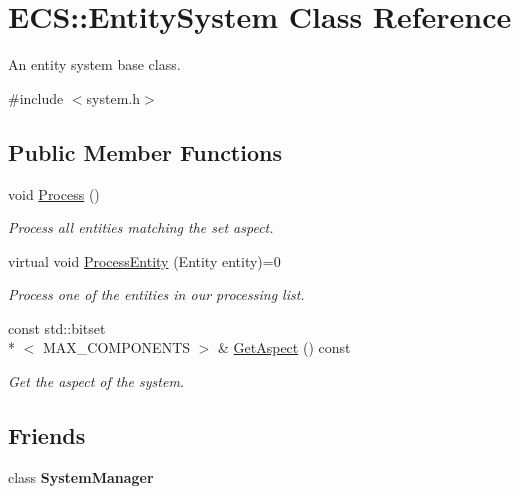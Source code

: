 \hypertarget{class_e_c_s_1_1_entity_system}{\section{E\-C\-S\-:\-:Entity\-System Class Reference}
\label{class_e_c_s_1_1_entity_system}
}


An entity system base class.  




{\ttfamily \#include $<$system.\-h$>$}

\subsection*{Public Member Functions}
\begin{DoxyCompactItemize}
\item 
\hypertarget{class_e_c_s_1_1_entity_system_a9f67d3f6c3b997a164665f1a36e19f0d}{void \hyperlink{class_e_c_s_1_1_entity_system_a9f67d3f6c3b997a164665f1a36e19f0d}{Process} ()}\label{class_e_c_s_1_1_entity_system_a9f67d3f6c3b997a164665f1a36e19f0d}

\begin{DoxyCompactList}\small\item\em Process all entities matching the set aspect. \end{DoxyCompactList}\item 
virtual void \hyperlink{class_e_c_s_1_1_entity_system_a5f2443358fcbe4ddd7c2bfb46d75cd86}{Process\-Entity} (Entity entity)=0
\begin{DoxyCompactList}\small\item\em Process one of the entities in our processing list. \end{DoxyCompactList}\item 
\hypertarget{class_e_c_s_1_1_entity_system_ab5bd1ebaeab36edbe5619110bfb469fd}{const std\-::bitset\\*
$<$ M\-A\-X\-\_\-\-C\-O\-M\-P\-O\-N\-E\-N\-T\-S $>$ \& \hyperlink{class_e_c_s_1_1_entity_system_ab5bd1ebaeab36edbe5619110bfb469fd}{Get\-Aspect} () const }\label{class_e_c_s_1_1_entity_system_ab5bd1ebaeab36edbe5619110bfb469fd}

\begin{DoxyCompactList}\small\item\em Get the aspect of the system. \end{DoxyCompactList}\end{DoxyCompactItemize}
\subsection*{Friends}
\begin{DoxyCompactItemize}
\item 
\hypertarget{class_e_c_s_1_1_entity_system_ab1ef2aa9992dd8ae85793e1a1f980e1e}{class {\bfseries System\-Manager}}\label{class_e_c_s_1_1_entity_system_ab1ef2aa9992dd8ae85793e1a1f980e1e}

\end{DoxyCompactItemize}


